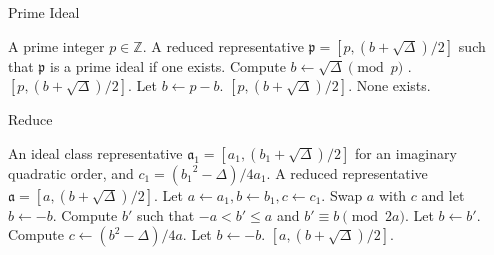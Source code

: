 \documentclass{ucalgthes1}
\theoremstyle{plain}
\theoremstyle{definition}
\newcommand{\ZZ}{\mathbb{Z}}
\begin{document}
\bigbreak
\bigbreak


\begin{comment}
\begin{algorithm}[h]
\caption{Identity}
\label{alg:identity}
\begin{algorithmic}[1]
\ENSURE A reduced representative for the class of principal ideals.
\IF {$\Delta \equiv 1 \pmod 4$}
	\STATE Let $b = 1$.
\ELSE
	\STATE Let $b = 0$.
\ENDIF
\RETURN $[1, (b+\sqrt\Delta)/2]$.
\end{algorithmic}
\end{algorithm}
\end{comment}

\begin{comment}
\begin{algorithm}[h]
\caption{Iverse}
\label{alg:inverse}
\begin{algorithmic}[1]
\REQUIRE A reduced representative $\mathfrak a = [a, (b+\sqrt\Delta)/2]$.
\ENSURE A reduced representative $\mathfrak a^{-1}$ such that $\mathfrak a \mathfrak a^{-1}$ is principal.
\RETURN $[a, (-b+\sqrt\Delta)/2]$.
\end{algorithmic}
\end{algorithm}
\end{comment}


\begin{algorithm}[h]
\caption{Prime Ideal}
\label{alg:prime}
\begin{algorithmic}[1]
\REQUIRE A prime integer $p \in \ZZ$.
\ENSURE A reduced representative $\mathfrak p = [p, (b+\sqrt\Delta)/2]$ such that $\mathfrak p$ is a prime ideal if one exists.
\STATE Compute $b \leftarrow \sqrt\Delta \pmod p$ .
	\RETURN $[p, (b+\sqrt\Delta)/2]$.	
\ENDIF
\STATE Let $b \leftarrow p-b$.
	\RETURN $[p, (b+\sqrt\Delta)/2]$.	
\ENDIF
\RETURN None exists.
\end{algorithmic}
\end{algorithm}


\begin{algorithm}[h]
\caption{Reduce}
\label{alg:reduce}
\begin{algorithmic}[1]
\REQUIRE An ideal class representative $\mathfrak a_1 = [a_1, (b_1+\sqrt\Delta)/2]$ for an imaginary quadratic order, and $c_1 = ({b_1}^2 - \Delta)/4a_1$.
\ENSURE A reduced representative $\mathfrak a = [a, (b+\sqrt\Delta)/2]$.
\STATE Let $a \leftarrow a_1, b \leftarrow b_1, c \leftarrow c_1$.
		\STATE Swap $a$ with $c$ and let $b \leftarrow -b$.
	\ENDIF
		\STATE Compute $b'$ such that $-a < b' \le a$ and $b' \equiv b \pmod{2a}$.
		\STATE Let $b \leftarrow b'$.
		\STATE Compute $c \leftarrow (b^2-\Delta)/4a$.
	\ENDIF
\ENDWHILE
{}
	\STATE Let $b \leftarrow -b$.
\ENDIF
\RETURN $[a, (b+\sqrt\Delta)/2]$.
\end{algorithmic}
\end{algorithm}
\end{document}

